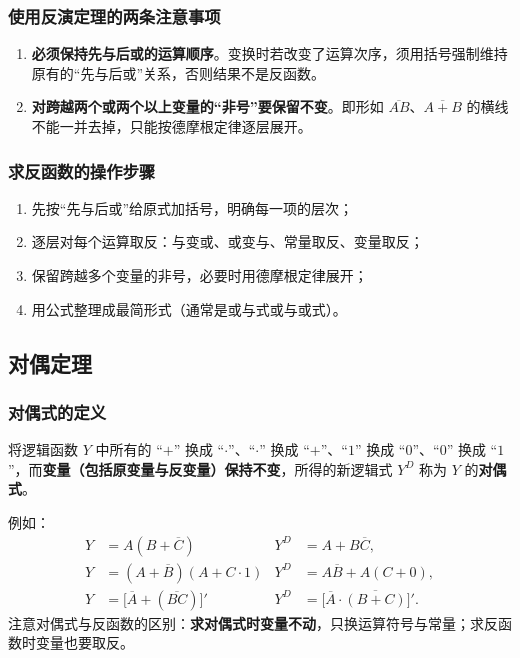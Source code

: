 \subsubsection{使用反演定理的两条注意事项}
\begin{enumerate}
    \item \textbf{必须保持先与后或的运算顺序}。变换时若改变了运算次序，须用括号强制维持原有的``先与后或''关系，否则结果不是反函数。
    \item \textbf{对跨越两个或两个以上变量的``非号''要保留不变}。即形如 $\overline{AB}$、$\overline{A+B}$ 的横线不能一并去掉，只能按德摩根定律逐层展开。
\end{enumerate}

\subsubsection{求反函数的操作步骤}
\begin{enumerate}
    \item 先按``先与后或''给原式加括号，明确每一项的层次；
    \item 逐层对每个运算取反：与变或、或变与、常量取反、变量取反；
    \item 保留跨越多个变量的非号，必要时用德摩根定律展开；
    \item 用公式整理成最简形式（通常是或与式或与或式）。
\end{enumerate}

\subsection{对偶定理}
\subsubsection{对偶式的定义}
将逻辑函数 $Y$ 中所有的 ``$+$'' 换成 ``$\cdot$''、``$\cdot$'' 换成 ``$+$''、``$1$'' 换成 ``$0$''、``$0$'' 换成 ``$1$''，而\textbf{变量（包括原变量与反变量）保持不变}，所得的新逻辑式 $Y^{D}$ 称为 $Y$ 的\textbf{对偶式}。

例如：
\begin{align*}
Y&=A(B+\overline{C}) & Y^{D}&=A+B\overline{C},\\
Y&=(A+\overline{B})(A+C\cdot 1) & Y^{D}&=A\overline{B}+A(C+0),\\
Y&=\bigl[\overline{A}+(\overline{BC})\bigr]' & Y^{D}&=\bigl[\overline{A}\cdot\overline{(B+C)}\bigr]'.
\end{align*}
注意对偶式与反函数的区别：\textbf{求对偶式时变量不动}，只换运算符号与常量；求反函数时变量也要取反。

